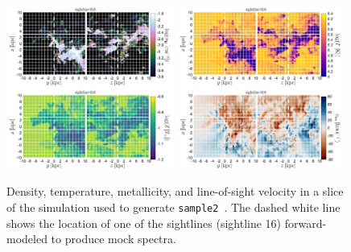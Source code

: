 \documentclass[fleqn,usenatbib]{mnras}
\begin{document}
\begin{figure}
    \centering
    \includegraphics[width=0.49\textwidth]{figures/sample2/projections/density_projection_maps_SL_16.jpg}
    \includegraphics[width=0.49\textwidth]{figures/sample2/projections/temperature_projection_maps_SL_16.jpg} \\
    \includegraphics[width=0.49\textwidth]{figures/sample2/projections/metallicity_projection_maps_SL_16.jpg}
    \includegraphics[width=0.49\textwidth]{figures/sample2/projections/velocity_projection_maps_SL_16.jpg}
    \caption{
    Density, temperature, metallicity, and line-of-sight velocity in a slice of the simulation used to generate \texttt{sample2}~\citep{mandelker2020Instability}.
    The dashed white line shows the location of one of the sightlines (sightline 16) forward-modeled to produce mock spectra.
    }
    \label{f: sample2 ray 16}
\end{figure}
\end{document}
